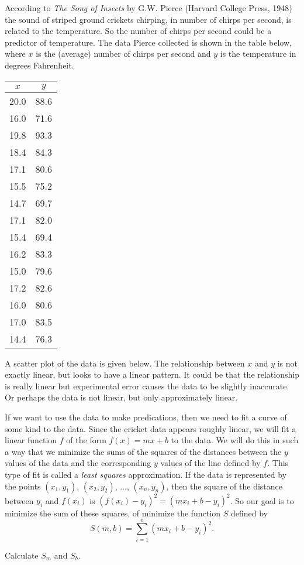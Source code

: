 \begin{exercises}
\item According to \emph{The Song of Insects} by G.W. Pierce (Harvard College Press, 1948) the sound of striped ground crickets chirping, in number of chirps per second, is related to the temperature. So the number of chirps per second could be a predictor of temperature. The data Pierce collected is shown in the table below, where $x$ is the (average) number of chirps per second and $y$ is the temperature in degrees Fahrenheit. 
\begin{center}
\begin{tabular}{|c|c|} \hline
$x$	&$y$ \\ \hline
20.0	&88.6 \\ \hline
16.0	&71.6 \\ \hline
19.8	&93.3 \\ \hline
18.4	&84.3 \\ \hline
17.1	&80.6 \\ \hline
15.5	&75.2 \\ \hline
14.7	&69.7 \\ \hline
17.1	&82.0 \\ \hline
15.4	&69.4 \\ \hline
16.2	&83.3 \\ \hline
15.0	&79.6 \\ \hline
17.2	&82.6 \\ \hline
16.0	&80.6 \\ \hline
17.0	&83.5 \\ \hline
14.4	&76.3 \\ \hline
\end{tabular}
\end{center}
A scatter plot of the data is given below. The relationship between $x$ and $y$ is not exactly linear, but looks to have a linear pattern. It could be that the relationship is really linear but experimental error causes the data to be slightly inaccurate. Or perhaps the data is not linear, but only approximately linear. 
 \begin{center}
    \end{center}

If we want to use the data to make predications, then we need to fit a curve of some kind to the data. Since the cricket data appears roughly linear, we will fit a linear function $f$ of the form $f(x) = mx+b$ to the data. We will do this in such a way that we minimize the sums of the squares of the distances between the $y$ values of the data and the corresponding $y$ values of the line defined by $f$. This type of fit is called a \emph{least squares} approximation. If the data is represented by the points $(x_1,y_1)$, $(x_2,y_2)$, $\ldots$, $(x_n,y_n)$, then the square of the distance between $y_i$ and $f(x_i)$ is $(f(x_i)-y_i)^2 = (mx_i+b-y_i)^2$. So our goal is to minimize the sum of these squares, of minimize the function $S$ defined by 
\[S(m,b) = \sum_{i=1}^n (mx_i+b-y_i)^2.\]
\ba
\item Calculate $S_m$ and $S_b$.


\end{exercises}
